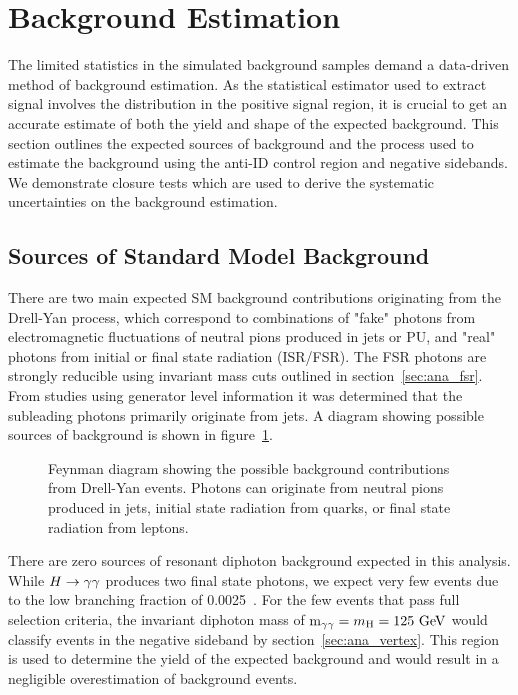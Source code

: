 \section{Background Estimation} \label{sec:ana_bkg}
The limited statistics in the simulated background samples demand a data-driven method of background estimation. As the statistical estimator used to extract signal involves the \lxy distribution in the positive \lxy signal region, it is crucial to get an accurate estimate of both the yield and shape of the expected background. This section outlines the expected sources of background and the process used to estimate the background using the anti-ID control region and negative \lxy sidebands. We demonstrate closure tests which are used to derive the systematic uncertainties on the background estimation.

\subsection{Sources of Standard Model Background} \label{sec:ana_bkgsources}
There are two main expected SM background contributions originating from the Drell-Yan process, which correspond to combinations of "fake" photons from electromagnetic fluctuations of neutral pions produced in jets or PU, and "real" photons from initial or final state radiation (ISR/FSR). The FSR photons are strongly reducible using invariant mass cuts outlined in section~\ref{sec:ana_fsr}. From studies using generator level information it was determined that the subleading photons primarily originate from jets. A diagram showing possible sources of background is shown in figure~\ref{fig:bkg_dyjets}.

\begin{figure}[htb!]
	\centering
	
	\caption[Feynman diagram showing the possible background contributions from Drell-Yan events. Photons can originate from neutral pions produced in jets, initial state radiation from quarks, or final state radiation from leptons.]{Feynman diagram showing the possible background contributions from Drell-Yan events. Photons can originate from neutral pions produced in jets, initial state radiation from quarks, or final state radiation from leptons.}
	\label{fig:bkg_dyjets}
\end{figure}

There are zero sources of resonant diphoton background expected in this analysis. While $\VH\to\gamma\gamma$ produces two final state photons, we expect very few events due to the low branching fraction of 0.0025~\cite{Workman:2022ynf}. For the few events that pass full selection criteria, the invariant diphoton mass of $\mgg=\mh=125\unit{GeV}$ would classify events in the negative \lxy sideband by section~\ref{sec:ana_vertex}. This region is used to determine the yield of the expected background and would result in a negligible overestimation of background events.

